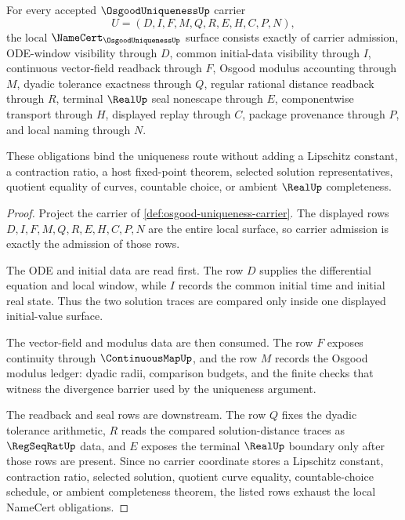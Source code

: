 \begin{theorem}
\label{thm:osgood-uniqueness-namecert-obligations}
For every accepted $\OsgoodUniquenessUp$ carrier
$$
U=(D,I,F,M,Q,R,E,H,C,P,N),
$$
the local $\NameCert_{\OsgoodUniquenessUp}$ surface consists exactly of carrier admission, ODE-window visibility through $D$, common initial-data visibility through $I$, continuous vector-field readback through $F$, Osgood modulus accounting through $M$, dyadic tolerance exactness through $Q$, regular rational distance readback through $R$, terminal $\RealUp$ seal nonescape through $E$, componentwise transport through $H$, displayed replay through $C$, package provenance through $P$, and local naming through $N$.

These obligations bind the uniqueness route without adding a Lipschitz constant, a contraction ratio, a host fixed-point theorem, selected solution representatives, quotient equality of curves, countable choice, or ambient $\RealUp$ completeness.
\end{theorem}
\begin{proof}
Project the carrier of \autoref{def:osgood-uniqueness-carrier}. The displayed rows $D,I,F,M,Q,R,E,H,C,P,N$ are the entire local surface, so carrier admission is exactly the admission of those rows.

The ODE and initial data are read first. The row $D$ supplies the differential equation and local window, while $I$ records the common initial time and initial real state. Thus the two solution traces are compared only inside one displayed initial-value surface.

The vector-field and modulus data are then consumed. The row $F$ exposes continuity through $\ContinuousMapUp$, and the row $M$ records the Osgood modulus ledger: dyadic radii, comparison budgets, and the finite checks that witness the divergence barrier used by the uniqueness argument.

The readback and seal rows are downstream. The row $Q$ fixes the dyadic tolerance arithmetic, $R$ reads the compared solution-distance traces as $\RegSeqRatUp$ data, and $E$ exposes the terminal $\RealUp$ boundary only after those rows are present. Since no carrier coordinate stores a Lipschitz constant, contraction ratio, selected solution, quotient curve equality, countable-choice schedule, or ambient completeness theorem, the listed rows exhaust the local NameCert obligations.
\end{proof}

